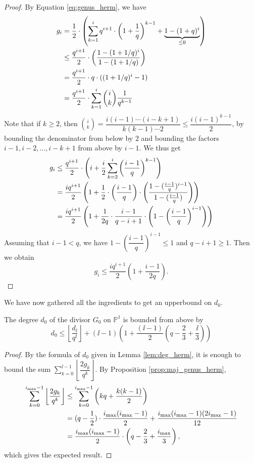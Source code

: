 \documentclass[10pt]{article}
\begin{document}
\begin{proof}
By Equation  \eqref{eq:genus_herm}, we have
\begin{align*}
g_i  &=\dfrac{1}{2} \cdot \left(\sum\limits_{k=1}^i q^{i+1} \cdot \left(1+\frac{1}{q}\right)^{k-1} +\underbrace{1 -(1+q)^i}_{\leq 0}\right) \\
	&\leq \dfrac{q^{i+1}}{2} \cdot \left(\dfrac{1-(1+1/q)^i}{1-(1+1/q)}\right) \\
	& = \dfrac{q^{i+1}}{2} \cdot q \cdot ((1+1/q)^i-1) \\
	& = \dfrac{q^{i+1}}{2} \cdot \sum\limits_{k=1}^i \binom{i}{k} \dfrac{1}{q^{k-1}}
\end{align*}
Note that if $k \geq 2$, then $\binom{i}{k} = \dfrac{i(i-1) \cdots (i-k+1)}{k(k-1) \cdots 2} \leq \dfrac{i(i-1)^{k-1}}{2}$, by bounding the denominator from below by $2$ and bounding the factors $i-1,i-2,...,i-k+1$ from above by $i-1$. We thus get
\begin{align*}
g_i &\leq \dfrac{q^{i+1}}{2} \cdot \left( i + \frac{i}{2} \sum\limits_{k=2}^i \left(\dfrac{i-1}{q}\right)^{k-1}\right) \\
	&= \dfrac{iq^{i+1}}{2} \left( 1 + \frac{1}{2} \cdot \left(\frac{i-1}{q}\right) \cdot \left(\dfrac{1-(\frac{i-1}{q})^{i-1}}{1-(\frac{i-1}{q})}\right)\right) \\
		&= \dfrac{iq^{i+1}}{2} \left( 1 + \frac{1}{2q} \cdot \dfrac{i-1}{q-i+1} \cdot \left(1- \left(\dfrac{i-1}{q}\right)^{i-1}\right)\right)\end{align*}
Assuming that $i-1 < q$, we have $1- \left(\dfrac{i-1}{q}\right)^{i-1} \leq 1$ and $q-i+1 \geq 1$. Then we obtain 	
	\[g_i \leq \dfrac{iq^{i+1}}{2} \left( 1 + \frac{i-1}{2q}\right).\]
\end{proof}

We have now gathered all the ingredients to get an upperbound on $d_0$.

\begin{corollary}
The degree $d_0$ of the divisor $G_0$ on $\mathbb{P}^1$ is bounded from above by 
\[d_0 \leq \left\lfloor \dfrac{d_{\ii}}{q^{\ii}}\right\rfloor + (\ii-1)\left( 1+\dfrac{(\ii-1)}{2} \left(q-\frac{2}{3} + \frac{\ii}{3}\right) \right) \]
\end{corollary}

\begin{proof}
	By the formula of $d_0$ given in Lemma \ref{lem:deg_herm}, it is enough to bound the sum $\sum\limits_{k=0}^{\ii-1} \left\lfloor \dfrac{2g_k}{q^k}\right\rfloor$. By Proposition \ref{prop:maj_genus_herm},
\begin{align*}
\sum\limits_{k=0}^{i_{\rm{max}}-1} \left\lfloor \dfrac{2g_k}{q^k}\right\rfloor & \leq  \sum\limits_{k=0}^{i_{\rm{max}}-1} \left(kq + \dfrac{k(k-1)}{2}\right)  \\
	&= (q-\frac{1}{2}) \cdot \dfrac{i_{\rm{max}}(i_{\rm{max}}-1)}{2} + \dfrac{i_{\rm{max}}(i_{\rm{max}}-1)(2i_{\rm{max}}-1)}{12} \\
	&= \dfrac{i_{\rm{max}}(i_{\rm{max}}-1)}{2}\cdot \left(q-\frac{2}{3} + \frac{i_{\rm{max}}}{3}\right),
\end{align*}
which gives the expected result.
\end{proof}
\end{document}
